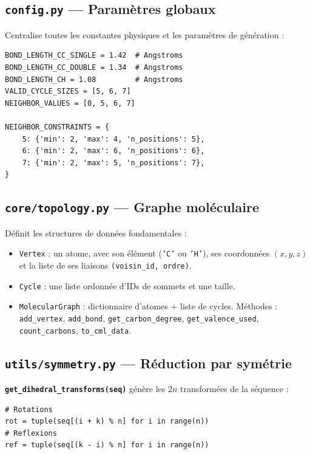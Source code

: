 \documentclass[a4paper,12pt]{article}
\begin{document}
\subsection{\texttt{config.py} — Paramètres globaux}

Centralise toutes les constantes physiques et les paramètres de génération :

\begin{lstlisting}
BOND_LENGTH_CC_SINGLE = 1.42  # Angstroms
BOND_LENGTH_CC_DOUBLE = 1.34  # Angstroms
BOND_LENGTH_CH = 1.08         # Angstroms
VALID_CYCLE_SIZES = [5, 6, 7]
NEIGHBOR_VALUES = [0, 5, 6, 7]

NEIGHBOR_CONSTRAINTS = {
    5: {'min': 2, 'max': 4, 'n_positions': 5},
    6: {'min': 2, 'max': 6, 'n_positions': 6},
    7: {'min': 2, 'max': 5, 'n_positions': 7},
}
\end{lstlisting}

\subsection{\texttt{core/topology.py} — Graphe moléculaire}

Définit les structures de données fondamentales :

\begin{itemize}
  \item \texttt{Vertex} : un atome, avec son élément (\texttt{'C'} ou \texttt{'H'}),
    ses coordonnées $(x, y, z)$ et la liste de ses liaisons \texttt{(voisin\_id, ordre)}.
  \item \texttt{Cycle} : une liste ordonnée d'IDs de sommets et une taille.
  \item \texttt{MolecularGraph} : dictionnaire d'atomes + liste de cycles. Méthodes :
    \texttt{add\_vertex}, \texttt{add\_bond}, \texttt{get\_carbon\_degree},
    \texttt{get\_valence\_used}, \texttt{count\_carbons}, \texttt{to\_cml\_data}.
\end{itemize}


\subsection{\texttt{utils/symmetry.py} — Réduction par symétrie}

\textbf{\texttt{get\_dihedral\_transforms(seq)}} génère les $2n$ transformées de la séquence :
\begin{lstlisting}
# Rotations
rot = tuple(seq[(i + k) % n] for i in range(n))
# Reflexions
ref = tuple(seq[(k - i) % n] for i in range(n))
\end{lstlisting}
\end{document}

